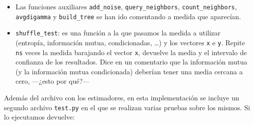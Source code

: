 \documentclass[12pt,a4paper]{report} %
\theoremstyle{definition}
\begin{document}
\begin{itemize}
\item Las funciones auxiliares \texttt{add\_noise}, \texttt{query\_neighbors}, \texttt{count\_neighbors}, \texttt{avgdigamma} y \texttt{build\_tree} se han ido comentando a medida que aparecían.

\item \texttt{shuffle\_test}: es una función a la que pasamos la medida a utilizar (entropía, información mutua, condicionadas, \dots) y los vectores \texttt{x} e \texttt{y}. Repite \texttt{ns} veces la medida barajando el vector \texttt{x}, devuelve la media y el intervalo de confianza de los resultados. Dice en un comentario que la información mutua (y la información mutua condicionada) deberían tener una media cercana a cero, ---¿esto por qué?---
\end{itemize}

Además del archivo con los estimadores, en esta implementación se incluye un segundo archivo \texttt{test.py} en el que se realizan varias pruebas sobre los mismos. Si lo ejecutamos devuelve:
\end{document}
